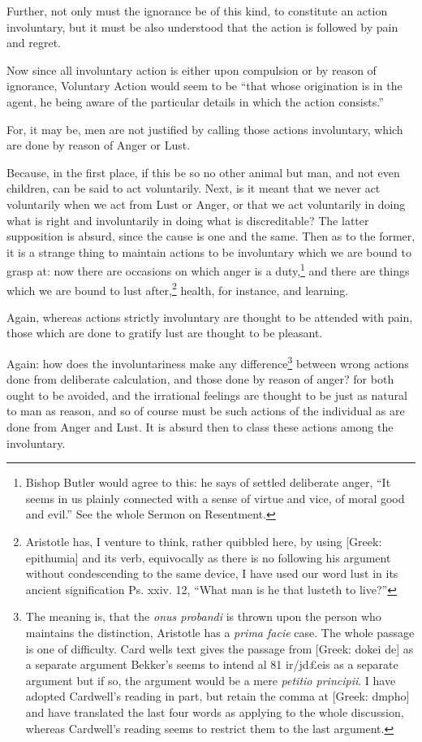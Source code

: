 Further, not only must the ignorance be of this kind, to constitute an action
involuntary, but it must be also understood that the action is followed by pain
and regret.


Now since all involuntary action is either upon compulsion or by reason of
ignorance, Voluntary Action would seem to be “that whose origination is
in the agent, he being aware of the particular details in which the action
consists.”

For, it may be, men are not justified by calling those actions involuntary,
which are done by reason of Anger or Lust.

Because, in the first place, if this be so no other animal but man, and not
even children, can be said to act voluntarily. Next, is it meant that we never
act voluntarily when we act from Lust or Anger, or that we act voluntarily in
doing what is right and involuntarily in doing what is discreditable? The
latter supposition is absurd, since the cause is one and the same. Then as to
the former, it is a strange thing to maintain actions to be involuntary which
we are bound to grasp at: now there are occasions on which anger is a duty,\footnote{Bishop Butler would agree to this: he says of settled deliberate anger,
“It seems in us plainly connected with a sense of virtue and vice, of
moral good and evil.” See the whole Sermon on Resentment.}
and there are things which we are bound to lust after,\footnote{Aristotle has, I venture to think, rather quibbled here, by using [Greek:
epithumia] and its verb, equivocally as there is no following his argument
without condescending to the same device, I have used our word lust in its
ancient signification Ps. xxiv. 12, “What man is he that lusteth to
live?”}
health, for instance, and learning.

Again, whereas actions strictly involuntary are thought to be attended with
pain, those which are done to gratify lust are thought to be pleasant.

Again: how does the involuntariness make any difference\footnote{The meaning is, that the \emph{onus probandi} is thrown upon the person who
maintains the distinction, Aristotle has a \emph{prima facie} case. The whole
passage is one of difficulty. Card wells text gives the passage from [Greek:
dokei de] as a separate argument Bekker’s seems to intend al 81 ir/jd£eis
as a separate argument but if so, the argument would be a mere \emph{petitio
principii}. I have adopted Cardwell’s reading in part, but retain the
comma at [Greek: dmpho] and have translated the last four words as applying to
the whole discussion, whereas Cardwell’s reading seems to restrict them
to the last argument.}
between wrong actions done from deliberate calculation, and those done by
reason of anger? for both ought to be avoided, and the irrational feelings are
thought to be just as natural to man as reason, and so of course must be such
actions of the individual as are done from Anger and Lust. It is absurd then to
class these actions among the involuntary.

